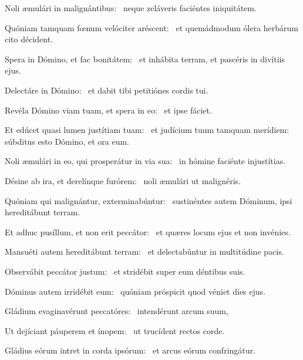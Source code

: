 \item Noli æmulári in malignántibus:~\psstar{} neque zeláveris faciéntes iniquitátem.

\item Quóniam tamquam fœnum velóciter aréscent:~\psstar{} et quemádmodum ólera herbárum cito décident.

\item Spera in Dómino, et fac bonitátem:~\psstar{} et inhábita terram, et pascéris in divítiis ejus.

\item Delectáre in Dómino:~\psstar{} et dabit tibi petitiónes cordis tui.

\item Revéla Dómino viam tuam, et spera in eo:~\psstar{} et ipse fáciet.

\item Et edúcet quasi lumen justítiam tuam:~\pscross{} et judícium tuum tamquam merídiem:~\psstar{} súbditus esto Dómino, et ora eum.

\item Noli æmulári in eo, qui prosperátur in via sua:~\psstar{} in hómine faciénte injustítias.

\item Désine ab ira, et derelínque furórem:~\psstar{} noli æmulári ut malignéris.

\item Quóniam qui malignántur, exterminabúntur:~\psstar{} sustinéntes autem Dóminum, ipsi hereditábunt terram.

\item Et adhuc pusíllum, et non erit peccátor:~\psstar{} et quæres locum ejus et non invénies.

\item Mansuéti autem hereditábunt terram:~\psstar{} et delectabúntur in multitúdine pacis.

\item Observábit peccátor justum:~\psstar{} et stridébit super eum déntibus suis.

\item Dóminus autem irridébit eum:~\psstar{} quóniam próspicit quod véniet dies ejus.

\item Gládium evaginavérunt peccatóres:~\psstar{} intendérunt arcum suum,

\item Ut dejíciant páuperem et ínopem:~\psstar{} ut trucídent rectos corde.

\item Gládius eórum intret in corda ipsórum:~\psstar{} et arcus eórum confringátur.
